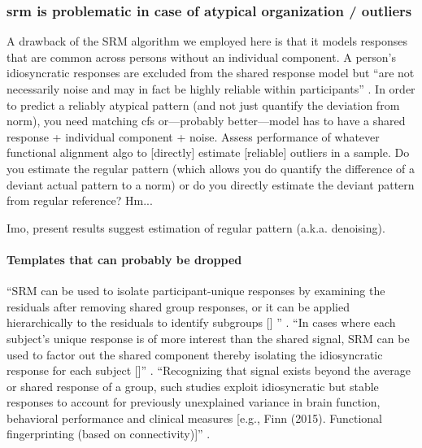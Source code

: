 \subsubsection{\ac{srm} is problematic in case of atypical organization /
outliers}


%
A drawback of the SRM algorithm we employed here is that it models responses
that are common across persons without an individual component.
%
A person's idiosyncratic responses are excluded from the shared response model
but ``are not necessarily noise and may in fact be highly reliable within
participants'' \citep{cohen2017computational}.
%
In order to predict a reliably atypical pattern (and not just quantify the
deviation from norm), you need matching \ac{cfs} or---probably better---model
has to have a shared response + individual component + noise.
%
Assess performance of whatever functional alignment algo to [directly] estimate
[reliable] outliers in a sample.
%
Do you estimate the regular pattern (which allows you do quantify the difference
of a deviant actual pattern to a norm) or do you directly estimate the deviant
pattern from regular reference? Hm...

%
Imo, present results suggest estimation of regular pattern (a.k.a. denoising).


\paragraph{Templates that can probably be dropped}
%
``SRM can be used to isolate participant-unique responses by examining the
residuals after removing shared group responses, or it can be applied
hierarchically to the residuals to identify subgroups [\citet{chen2017shared}]
'' \citep{cohen2017computational}.
%
``In cases where each subject's unique response is of more interest than the
shared signal, SRM can be used to factor out the shared component thereby
isolating the idiosyncratic response for each subject
[\citep{chen2015reduced}]'' \citep{kumar2020brainiak}.
%
``Recognizing that signal exists beyond the average or shared response of a
group, such studies exploit idiosyncratic but stable responses to account for
previously unexplained variance in brain function, behavioral performance and
clinical measures [e.g., Finn (2015). Functional fingerprinting (based on
connectivity)]'' \citep{cohen2017computational}.




